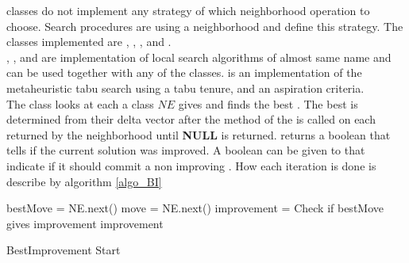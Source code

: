  classes do not implement any strategy of which neighborhood operation to choose. 
Search procedures are using a neighborhood and define this strategy. The classes implemented 
are , , , and . \\
, , and  are implementation of local search 
algorithms of almost same name and can be used together with any of the  classes. 
 is an implementation of the metaheuristic tabu search using a tabu tenure, and 
an aspiration criteria. \medskip \\
The class  looks at each  a  class $NE$ gives and finds the 
best . The best  is determined from their delta vector after the method 
 of the  is called on each  returned by the neighborhood 
until \textbf{NULL} is returned.  returns a boolean that tells if the current solution was 
improved. A boolean can be given to  that indicate if it should commit a non improving 
. How each iteration is done is describe by algorithm \ref{algo_BI} \\ 
\IncMargin{1em}
\begin{algorithm}[H]

\algdata
{}
\BlankLine
 bestMove = NE.next() \;
 move = NE.next() \;
\bool improvement = Check if bestMove gives improvement \;
 \;
\Return improvement \;

\caption{BestImprovement Start} \label{algo_BI} 
\end{algorithm} \noindent
